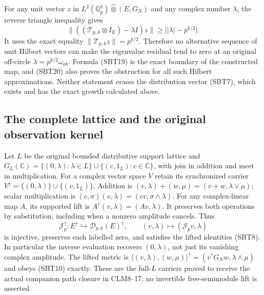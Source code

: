 \documentclass[11pt]{article}
\begin{document}
For any unit vector $z$ in $L^2(\mathbb Q_p^k)\widehat\otimes(E,G_N)$ and any
complex number $\lambda$, the reverse triangle inequality gives
\begin{equation}\tag{SBT20}
 \|((\mathscr T_{p,k}\otimes I_E)-\lambda I)z\|
       \ge\bigl||\lambda|-p^{k/2}\bigr|.
\end{equation}
It uses the exact equality $\|\mathscr T_{p,k}z\|=p^{k/2}$.
Therefore no alternative sequence of unit Hilbert vectors can make
the eigenvalue residual tend to zero at an original off-circle
$\lambda=p^{k/2}\omega_{ab}$. Formula (SBT19) is the exact boundary
of the constructed map, and (SBT20) also proves the obstruction for
all such Hilbert approximations. Neither statement erases the
distribution vector (SBT7), which exists and has the exact growth
calculated above.

\subsection{The complete lattice and the original observation kernel}

Let $L$ be the original bounded distributive support lattice and
$G_L(\mathbb C)=\{(0,\lambda):\lambda\in L\}\cup
\{(c,1_L):c\in\mathbb C\}$, with join in addition and meet in
multiplication. For a complex vector space $V$ retain its synchronized
carrier $V^\uparrow=\{(0,\lambda)\}\cup\{(v,1_L)\}$.
Addition is $(v,\lambda)+(w,\mu)=(v+w,\lambda\vee\mu)$;
scalar multiplication is $(c,\sigma)(v,\lambda)=(cv,\sigma\wedge\lambda)$.
For any complex-linear map $A$, its supported lift is
$A^\uparrow(v,\lambda)=(Av,\lambda)$. It preserves both operations
by substitution, including when a nonzero amplitude cancels. Thus
\begin{equation}\tag{SBT21}
 \mathcal J_p^\uparrow:E^\uparrow\hookrightarrow
                   \mathcal D_{p,k}(E)^\uparrow,
 \qquad (v,\lambda)\longmapsto(\mathcal J_pv,\lambda)
\end{equation}
is injective, preserves each labelled zero, and satisfies the lifted
identities (SBT8). In particular the inverse evaluation recovers
$(0,\lambda)$, not just its vanishing complex amplitude.
The lifted metric is
$\langle(v,\lambda),(w,\mu)\rangle^\uparrow
 =(v^*G_Nw,\lambda\wedge\mu)$ and obeys (SBT10) exactly.
These are the full-$L$ carriers proved to receive the actual companion
path closure in CLM8--17; no invertible free-semimodule lift is asserted.
\end{document}
